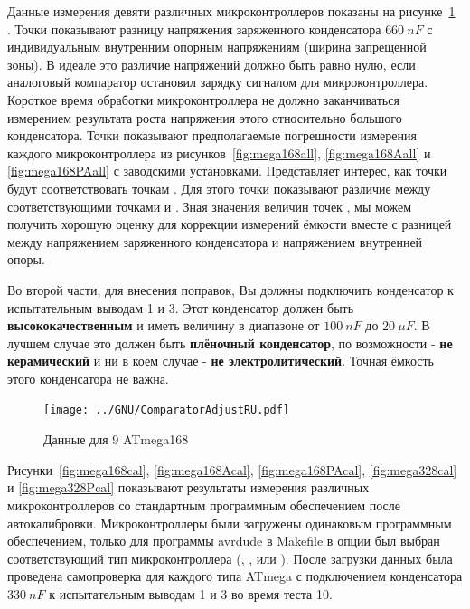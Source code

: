 Данные  измерения девяти различных микроконтроллеров показаны на рисунке~\ref{fig:CompAdjust} .
Точки  показывают разницу напряжения заряженного конденсатора \(660~nF\) с  индивидуальным внутренним 
опорным напряжениям (ширина запрещенной зоны). В идеале это различие напряжений должно быть равно нулю, если 
аналоговый компаратор остановил зарядку сигналом для микроконтроллера. Короткое время обработки микроконтроллера 
не должно заканчиваться измерением результата роста напряжения этого относительно большого конденсатора. 
Точки  показывают предполагаемые погрешности измерения каждого 
микроконтроллера из рисунков~\ref{fig:mega168all}, \ref{fig:mega168Aall} 
и \ref{fig:mega168PAall} с заводскими установками. Представляет интерес, как точки  будут соответствовать 
точкам . Для этого точки  показывают различие между соответствующими точками  и . 
Зная значения величин точек , мы можем получить хорошую оценку для коррекции измерений ёмкости вместе с 
разницей между напряжением заряженного конденсатора и напряжением внутренней опоры. 

Во второй части, для внесения поправок, Вы должны подключить конденсатор к испытательным выводам 1 и 3. Этот 
конденсатор должен быть \textbf{ высококачественным} и иметь величину в диапазоне от \(100~nF\) до \(20~\mu F\).
В лучшем случае это должен быть \textbf{ плёночный конденсатор}, по возможности - \textbf{ не керамический} и ни в коем 
случае - \textbf{ не электролитический}. Точная ёмкость этого конденсатора не важна.

\begin{figure}[H]
\centering
\texttt{[image: ../GNU/ComparatorAdjustRU.pdf]}
\caption{Данные для 9 ATmega168}
\label{fig:CompAdjust}
\end{figure}

Рисунки~\ref{fig:mega168cal}, \ref{fig:mega168Acal}, \ref{fig:mega168PAcal}, \ref{fig:mega328cal} 
и \ref{fig:mega328Pcal} показывают результаты измерения различных микроконтроллеров со стандартным программным 
обеспечением после автокалибровки. Микроконтроллеры были загружены одинаковым программным обеспечением, только 
для программы avrdude в Makefile в опции   был выбран соответствующий тип микроконтроллера (, 
,  или ). После загрузки данных была проведена самопроверка для каждого типа ATmega с 
подключением конденсатора \(330~nF\) к испытательным выводам 1 и 3 во время теста 10.

